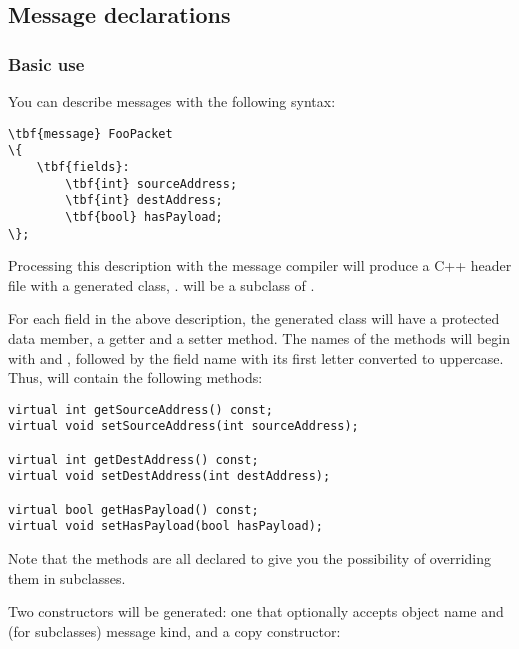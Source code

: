 %

\subsection{Message declarations}

\subsubsection{Basic use}

You can describe messages with the following syntax:

\begin{Verbatim}[commandchars=\\\{\}]
\tbf{message} FooPacket
\{
    \tbf{fields}:
        \tbf{int} sourceAddress;
        \tbf{int} destAddress;
        \tbf{bool} hasPayload;
\};
\end{Verbatim}

Processing this description with the message compiler will produce
a C++ header file with a generated class, .
 will be a subclass of .

For each field in the above description, the generated class will have
a protected data member, a getter and a setter method. The names of the
methods will begin with  and ,
followed by the field name with its first letter converted to uppercase.
Thus,  will contain the following methods:

\begin{verbatim}
virtual int getSourceAddress() const;
virtual void setSourceAddress(int sourceAddress);

virtual int getDestAddress() const;
virtual void setDestAddress(int destAddress);

virtual bool getHasPayload() const;
virtual void setHasPayload(bool hasPayload);
\end{verbatim}

Note that the methods are all declared  to give you the possibility
of overriding them in subclasses.

Two constructors will be generated: one that optionally accepts object name and
(for  subclasses) message kind, and a copy constructor:

